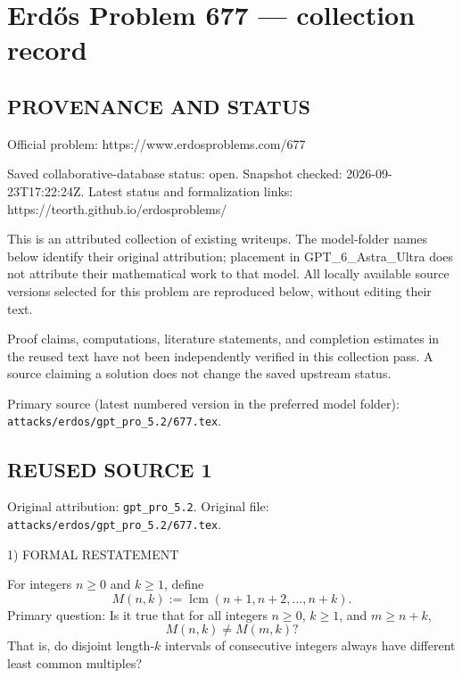 \section*{Erd\H{o}s Problem 677 --- collection record}

\subsection*{PROVENANCE AND STATUS}
Official problem: https://www.erdosproblems.com/677

Saved collaborative-database status: open.
Snapshot checked: 2026-09-23T17:22:24Z.
Latest status and formalization links: https://teorth.github.io/erdosproblems/

This is an attributed collection of existing writeups. The model-folder names below identify their original attribution; placement in GPT\_6\_Astra\_Ultra does not attribute their mathematical work to that model. All locally available source versions selected for this problem are reproduced below, without editing their text.

Proof claims, computations, literature statements, and completion estimates in the reused text have not been independently verified in this collection pass. A source claiming a solution does not change the saved upstream status.

Primary source (latest numbered version in the preferred model folder): \texttt{attacks/erdos/gpt\_pro\_5.2/677.tex}.

\subsection*{REUSED SOURCE 1}
Original attribution: \texttt{gpt\_pro\_5.2}.
Original file: \texttt{attacks/erdos/gpt\_pro\_5.2/677.tex}.


1) FORMAL RESTATEMENT

For integers $n\ge 0$ and $k\ge 1$, define
\[
M(n,k):=\operatorname{lcm}(n+1,n+2,\dots,n+k).
\]
Primary question: Is it true that for all integers $n\ge 0$, $k\ge 1$, and $m\ge n+k$,
\[
 M(n,k)\ne M(m,k)?
\]
That is, do disjoint length-$k$ intervals of consecutive integers always have different least common multiples?

